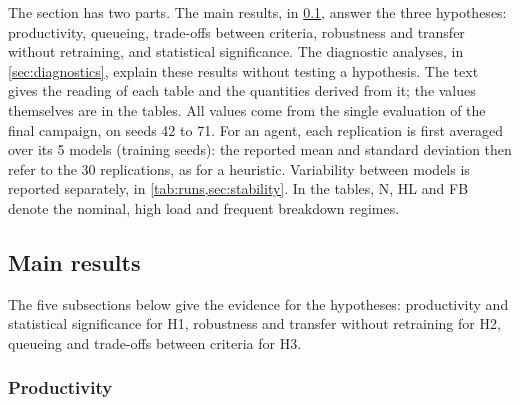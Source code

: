 \documentclass[11pt,a4paper]{article}
\newif\ifrevmarks
\newcommand{\revtag}[1]{\ifrevmarks\textsuperscript{\textcolor{red!70!black}{\scriptsize[#1]}}\fi}
\newenvironment{revbloc}[1]{\par\ifrevmarks\color{revcolor}\noindent\revtag{#1}\ \fi}{\par}
\newif\ifcorrmarks
\newcommand{\corr}[1]{\ifcorrmarks\textcolor{corrcolor}{#1}\else#1\fi}
\newenvironment{corrbloc}{\par\ifcorrmarks\color{corrcolor}\fi}{\par}
\begin{document}
\begin{revbloc}{T31}
\corr{The section has two parts. The main results, in \cref{sec:main-results}, answer the three hypotheses: productivity, queueing, trade-offs between criteria, robustness and transfer without retraining, and statistical significance. The diagnostic analyses, in \cref{sec:diagnostics}, explain these results without testing a hypothesis. The text gives the reading of each table and the quantities derived from it; the values themselves are in the tables.} All values come from the single evaluation of the final campaign, on seeds 42 to 71. For an agent, each replication is first averaged over its 5 models (training seeds): the reported mean and standard deviation then refer to the 30 replications, as for a heuristic. Variability between models is reported separately, in \cref{tab:runs,sec:stability}. In the tables, N, HL and FB denote the nominal, high load and frequent breakdown regimes.
\end{revbloc}

\subsection{\corr{Main results}}
\label{sec:main-results}

\begin{corrbloc}
The five subsections below give the evidence for the hypotheses: productivity and statistical significance for H1, robustness and transfer without retraining for H2, queueing and trade-offs between criteria for H3.
\end{corrbloc}

\subsubsection{Productivity}
\label{sec:productivity}
\end{document}
